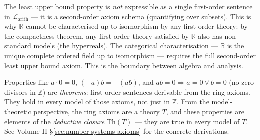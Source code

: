 \begin{remark}
The least upper bound property is \emph{not} expressible as a single
first-order sentence in $\mathcal{L}_{\mathrm{arith}}$ --- it is a
second-order axiom schema (quantifying over subsets).
This is why $\mathbb{R}$ cannot be characterised up to isomorphism
by any first-order theory: by the compactness theorem, any first-order
theory satisfied by $\mathbb{R}$ also has non-standard models
(the hyperreals).
The categorical characterisation --- $\mathbb{R}$ is the unique complete
ordered field up to isomorphism --- requires the full second-order
least upper bound axiom.
This is the boundary between algebra and analysis.
\end{remark}

\begin{remark}
Properties like $a \cdot 0 = 0$, $(-a)b = -(ab)$, and
$ab = 0 \Rightarrow a = 0 \lor b = 0$ (no zero divisors in $\mathbb{Z}$)
are \emph{theorems}: first-order sentences derivable from the ring axioms.
They hold in every model of those axioms, not just in $\mathbb{Z}$.
From the model-theoretic perspective, the ring axioms are a theory $T$,
and these properties are elements of the \emph{deductive closure}
$\mathrm{Th}(T)$ --- they are true in every model of $T$.
See Volume II \S\ref{sec:number-systems-axioms} for the concrete
derivations.
\end{remark}

